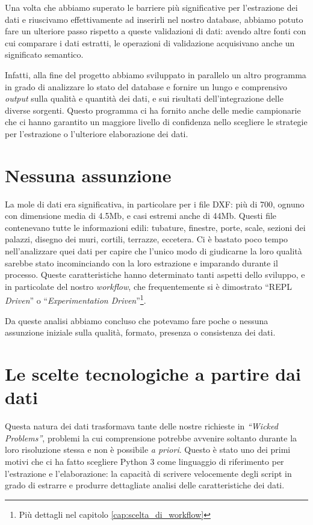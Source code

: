 \documentclass[12pt]{report}
\begin{document}
Una volta che abbiamo superato le barriere più significative per l'estrazione 
dei dati e riuscivamo effettivamente ad inserirli nel nostro 
database, abbiamo potuto fare un ulteriore passo rispetto a 
queste validazioni di dati: avendo altre fonti con cui comparare i dati
estratti, le operazioni di validazione acquisivano anche un significato
semantico. 

Infatti, alla fine del progetto abbiamo sviluppato in parallelo
un altro programma in grado di analizzare lo stato del database 
e fornire un lungo e comprensivo \textit{output} sulla 
qualità e quantità dei dati, e sui risultati dell'integrazione delle 
diverse sorgenti. Questo programma ci ha fornito anche delle medie campionarie che ci hanno 
garantito un maggiore livello di confidenza nello scegliere le
strategie per l'estrazione o l'ulteriore elaborazione dei dati.

\section*{Nessuna assunzione}

La mole di dati era significativa, in particolare per i file DXF: più di
700, ognuno con dimensione media di 4.5Mb, e casi estremi anche di
44Mb. Questi file contenevano tutte le informazioni edili: tubature,
finestre, porte, scale, sezioni dei palazzi, disegno dei muri,
cortili, terrazze, eccetera. Ci è bastato poco tempo nell'analizzare quei
dati per capire che l'unico modo di giudicarne la loro qualità sarebbe
stato incominciando con la loro estrazione e imparando durante il
processo. Queste caratteristiche hanno determinato tanti aspetti dello
sviluppo, e in particolate del nostro \textit{workflow}, che frequentemente si è
dimostrato ``REPL \textit{Driven}'' o ``\textit{Experimentation
Driven}''\footnote{Più dettagli nel capitolo \ref{cap:scelta_di_workflow}}. 

Da queste analisi abbiamo concluso che potevamo fare poche o nessuna
assunzione iniziale sulla qualità, formato, presenza o consistenza dei dati.

\section{Le scelte tecnologiche a partire dai dati}

Questa natura dei dati trasformava tante delle nostre richieste in
\textit{``Wicked Problems''}, problemi la cui comprensione potrebbe
avvenire soltanto durante la loro risoluzione stessa e non è
possibile \textit{a priori}. Questo è stato uno dei primi motivi che
ci ha fatto scegliere Python 3 come linguaggio di riferimento per
l'estrazione e l'elaborazione: la capacità di scrivere velocemente
degli script in grado di estrarre e produrre dettagliate analisi delle
caratteristiche dei dati. 
\end{document}

